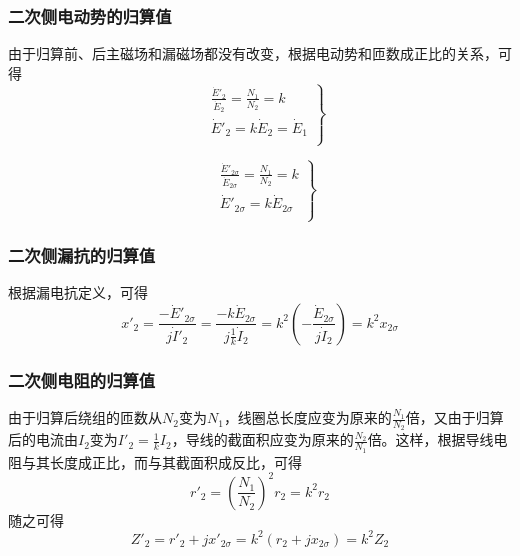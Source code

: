 \documentclass{book}
\begin{document}
\subsubsection{二次侧电动势的归算值}
由于归算前、后主磁场和漏磁场都没有改变，根据电动势和匝数成正比的关系，可得
\begin{equation}
\left. \begin{aligned}
& \frac{{{{{\dot{E}}'}}_{2}}}{{{{\dot{E}}}_{2}}}=\frac{{{N}_{1}}}{{{N}_{2}}}=k \\ 
& {{{{\dot{E}}'}}_{2}}=k{{{\dot{E}}}_{2}}={{{\dot{E}}}_{1}} \\ 
\end{aligned} \right\}
\label{2-28}
\end{equation}

\begin{equation}
\left. \begin{aligned}
& \frac{{{{{\dot{E}}'}}_{2\sigma }}}{{{{\dot{E}}}_{2\sigma }}}=\frac{{{N}_{1}}}{{{N}_{2}}}=k \\ 
& {{{{\dot{E}}'}}_{2\sigma }}=k{{{\dot{E}}}_{2\sigma }} \\ 
\end{aligned} \right\}
\label{2-29}
\end{equation}

\subsubsection{二次侧漏抗的归算值}
根据漏电抗定义，可得
\begin{equation}
{{{x}'}_{2}}=\frac{-{{{{\dot{E}}'}}_{2\sigma }}}{j{{{{\dot{I}}'}}_{2}}}=\frac{-k{{{\dot{E}}}_{2\sigma }}}{j\frac{1}{k}{{{\dot{I}}}_{2}}}={{k}^{2}}\left( -\frac{{{{\dot{E}}}_{2\sigma }}}{j{{{\dot{I}}}_{2}}} \right)={{k}^{2}}{{x}_{2\sigma }}
\label{2-30}
\end{equation}

\subsubsection{二次侧电阻的归算值}
由于归算后绕组的匝数从${{N}_{2}}$变为${{N}_{1}}$，线圈总长度应变为原来的$\frac{{{N}_{1}}}{{{N}_{2}}}$倍，又由于归算后的电流由${{I}_{2}}$变为${{{I}'}_{2}}=\frac{1}{k}{{I}_{2}}$，导线的截面积应变为原来的$\frac{{{N}_{2}}}{{{N}_{1}}}$倍。这样，根据导线电阻与其长度成正比，而与其截面积成反比，可得
\begin{equation}
{{{r}'}_{2}}={{\left( \frac{{{N}_{1}}}{{{N}_{2}}} \right)}^{2}}{{r}_{2}}={{k}^{2}}{{r}_{2}}
\label{2-31}
\end{equation}
随之可得
\begin{equation}
{{{Z}'}_{2}}={{{r}'}_{2}}+j{{{x}'}_{2\sigma }}={{k}^{2}}\left( {{r}_{2}}+j{{x}_{2\sigma }} \right)={{k}^{2}}{{Z}_{2}}
\label{2-32}
\end{equation}
\end{document}
